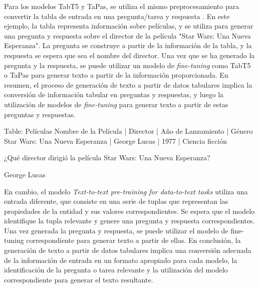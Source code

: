Para los modelos TabT5 y TaPas, se utiliza el mismo preprocesamiento para convertir la tabla de entrada en una pregunta/tarea y respuesta \cite{andrejczuk_table--text_2022, herzig_tapas_2020}. En este ejemplo, la tabla representa información sobre películas, y se utiliza para generar una pregunta y respuesta sobre el director de la película "Star Wars: Una Nueva Esperanza". La pregunta se construye a partir de la información de la tabla, y la respuesta se espera que sea el nombre del director. Una vez que se ha generado la pregunta y la respuesta, se puede utilizar un modelo de \emph{fine-tuning} como TabT5 o TaPas para generar texto a partir de la información proporcionada. En resumen, el proceso de generación de texto a partir de datos tabulares implica la conversión de información tabular en preguntas y respuestas, y luego la utilización de modelos de \emph{fine-tuning} para generar texto a partir de estas preguntas y respuestas.
\begin{tcolorbox}[colback=white,colframe=black!50!white,title=Input]
Table: Películas
Nombre de la Película     | Director                | Año de Lanzamiento | Género 
Star Wars: Una Nueva Esperanza | George Lucas        | 1977              | Ciencia ficción 
\end{tcolorbox}
\begin{tcolorbox}[colback=white,colframe=black!50!white,title=Pregunta]
¿Qué director dirigió la película Star Wars: Una Nueva Esperanza?
\end{tcolorbox}
\begin{tcolorbox}[colback=white,colframe=black!50!white,title=Respuesta esperada]
George Lucas
\end{tcolorbox}

\newpage
En cambio, el modelo \emph{Text-to-text pre-training for data-to-text tasks} \cite{kale_text--text_2020} utiliza una entrada diferente, que consiste en una serie de tuplas que representan las propiedades de la entidad y sus valores correspondientes. Se espera que el modelo identifique la tupla relevante y genere una pregunta y respuesta correspondientes. Una vez generada la pregunta y respuesta, se puede utilizar el modelo de fine-tuning correspondiente para generar texto a partir de ellas. En conclusión, la generación de texto a partir de datos tabulares implica una conversión adecuada de la información de entrada en un formato apropiado para cada modelo, la identificación de la pregunta o tarea relevante y la utilización del modelo correspondiente para generar el texto resultante.

